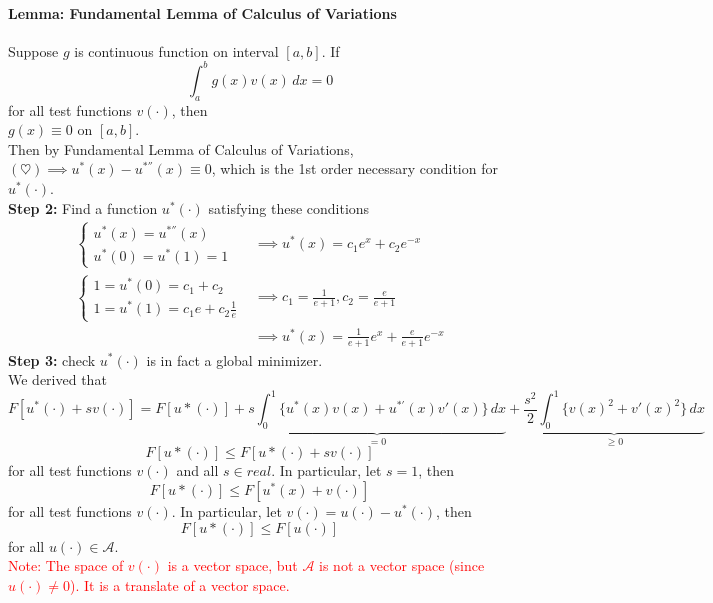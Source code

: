 \documentclass[11pt]{article}
\newcommand{\tb}[1]{\textbf{#1}}
\newcommand{\mc}[1]{\mathcal{#1}}
\begin{document}
\paragraph{Lemma: Fundamental Lemma of Calculus of Variations}
Suppose $g$ is continuous function on interval $[a,b]$. If
$$\int_a^b g(x)v(x) \, dx = 0$$ for all test functions $v(\cdot)$, then \\
$g(x) \equiv 0$ on $[a,b]$.\\
Then by Fundamental Lemma of Calculus of Variations, $(\heartsuit) \implies u^*(x) - u^{*''}(x) \equiv 0$, which is the 1st order necessary condition for $u^*(\cdot)$. \\
\tb{Step 2:} Find a function $u^*(\cdot)$ satisfying these conditions
\begin{align}
\begin{cases}
	u^*(x) = u^{*''}(x) \\
	u^*(0) = u^*(1) = 1
\end{cases} &\implies u^*(x) = c_1e^x + c_2e^{-x} \\
\begin{cases}
	1 = u^*(0) = c_1 + c_2 \\
	1 = u^*(1) = c_1e + c_2 \frac{1}{e}
\end{cases} &\implies c_1 = \frac{1}{e + 1}, c_2 = \frac{e}{e+1} \\
&\implies u^*(x) = \frac{1}{e + 1} e^x + \frac{e}{e+1}e^{-x}
\end{align}
\tb{Step 3:} check $u^*(\cdot)$ is in fact a global minimizer. \\
We derived that 
$$F[u^*(\cdot) + sv(\cdot)] = F[u*(\cdot)] + \underbrace{s\int_0^1 \{ u^*(x)v(x) + u^{*'}(x)v'(x)\} \, dx}_{=0} + \underbrace{\frac{s^2}{2} \int_0^1 \{ v(x)^2 + v'(x)^2 \} \, dx}_{\geq 0}$$
$$F[u*(\cdot)] \leq F[u*(\cdot) + sv(\cdot)]$$
for all test functions $v(\cdot)$ and all $s \in real$. In particular, let $s = 1$, then\\
$$F[u*(\cdot)] \leq F[u^*(x) + v(\cdot)]$$
for all test functions $v(\cdot)$. In particular, let $v(\cdot) = u(\cdot) - u^*(\cdot)$, then
$$F[u*(\cdot)] \leq F[u(\cdot)]$$ for all $u(\cdot) \in \mc{A}$. \\
\textcolor{red}{Note: The space of $v(\cdot)$ is a vector space, but $\mc{A}$ is not a vector space (since $u(\cdot) \neq 0$). It is a translate of a vector space.}
\end{document}
